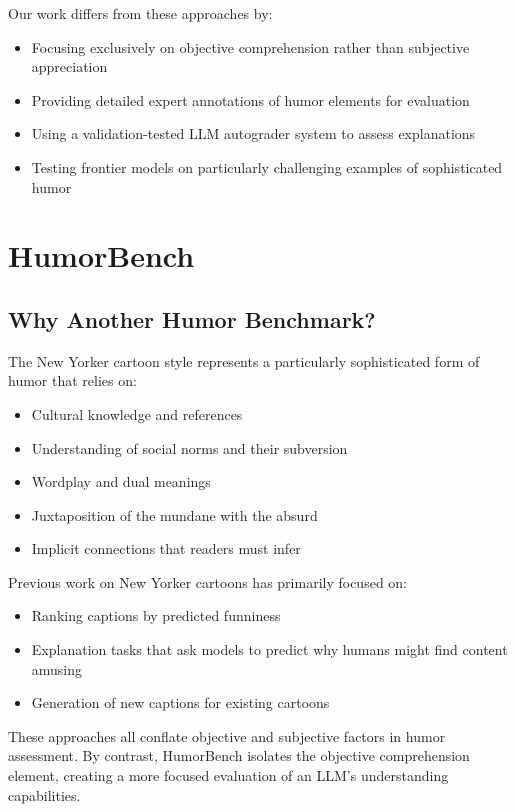 \documentclass[twocolumn]{article}
\begin{document}
Our work differs from these approaches by:
\begin{itemize}
    \item Focusing exclusively on objective comprehension rather than subjective appreciation
    \item Providing detailed expert annotations of humor elements for evaluation
    \item Using a validation-tested LLM autograder system to assess explanations
    \item Testing frontier models on particularly challenging examples of sophisticated humor
\end{itemize}


\section{HumorBench}

\subsection{Why Another Humor Benchmark?}

The New Yorker cartoon style represents a particularly sophisticated form of humor that relies on:
\begin{itemize}
    \item Cultural knowledge and references
    \item Understanding of social norms and their subversion
    \item Wordplay and dual meanings
    \item Juxtaposition of the mundane with the absurd
    \item Implicit connections that readers must infer
\end{itemize}

Previous work on New Yorker cartoons has primarily focused on:
\begin{itemize}
    \item Ranking captions by predicted funniness
    \item Explanation tasks that ask models to predict why humans might find content amusing
    \item Generation of new captions for existing cartoons
\end{itemize}

These approaches all conflate objective and subjective factors in humor assessment. By contrast, HumorBench isolates the objective comprehension element, creating a more focused evaluation of an LLM's understanding capabilities.
\end{document}
